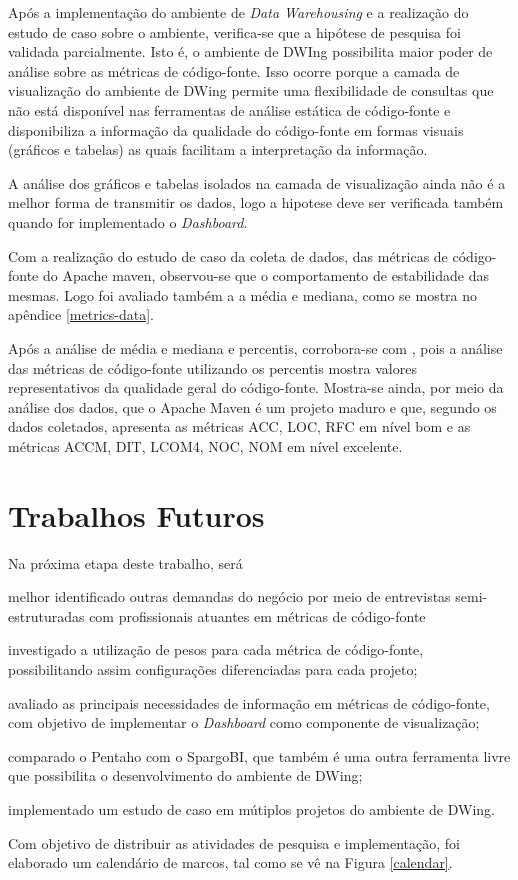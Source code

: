 Após a implementação do ambiente de \textit{Data Warehousing} e a realização do estudo de caso sobre o ambiente,  verifica-se que a hipótese de pesquisa foi validada parcialmente. Isto é, o ambiente de DWIng possibilita maior poder de análise sobre as métricas de código-fonte. Isso ocorre porque a camada de visualização do ambiente de DWing permite uma flexibilidade de consultas que não está disponível nas ferramentas de análise estática de código-fonte e disponibiliza a informação da qualidade do código-fonte em formas visuais (gráficos e tabelas) as quais facilitam a interpretação da informação.


A análise dos gráficos e tabelas isolados na camada de visualização ainda não é a melhor forma de transmitir os dados, logo a hipotese deve ser verificada também quando for implementado o \textit{Dashboard}. 


Com a realização do estudo de caso da coleta de dados, das métricas de código-fonte do Apache maven, observou-se que o comportamento de estabilidade das mesmas. Logo foi avaliado também a a média e mediana, como se mostra no apêndice \ref{metrics-data}.

Após a análise de média e mediana e percentis, corrobora-se com , pois a análise das métricas de código-fonte utilizando os percentis mostra valores representativos da qualidade geral do código-fonte. Mostra-se ainda, por meio da análise dos dados, que o Apache Maven é um projeto maduro e que, segundo os dados coletados, apresenta as métricas ACC, LOC, RFC em nível bom e as métricas ACCM, DIT, LCOM4, NOC, NOM em nível excelente.  



\section{Trabalhos Futuros}

Na próxima etapa deste trabalho, será \begin{inparaenum}[i)] \item melhor identificado outras demandas do negócio por meio de entrevistas semi-estruturadas com profissionais atuantes em métricas de código-fonte \item investigado a utilização de pesos para cada métrica de código-fonte, possibilitando assim configurações diferenciadas para cada projeto; \item avaliado as principais necessidades de informação em métricas de código-fonte, com objetivo de implementar o \textit{Dashboard} como componente de visualização; \item comparado o Pentaho com o SpargoBI, que também é uma outra ferramenta livre que possibilita o desenvolvimento do ambiente de DWing; \item implementado um estudo de caso em mútiplos projetos do ambiente de DWing. 
\end{inparaenum}
Com objetivo de distribuir as atividades de pesquisa e implementação, foi elaborado um calendário de marcos, tal como se vê na Figura \ref{calendar}.

